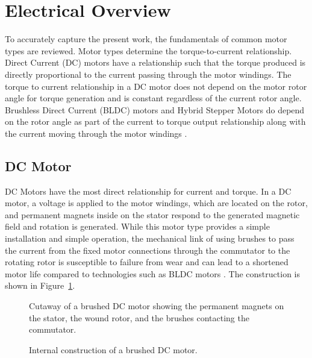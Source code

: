 \section{Electrical Overview}\label{sect:electricalOverview}
To accurately capture the present work, the fundamentals of common motor types are reviewed. Motor types determine the torque-to-current relationship. Direct Current (DC) motors have a relationship such that the torque produced is directly proportional to the current passing through the motor windings. The torque to current relationship in a DC motor does not depend on the motor rotor angle for torque generation and is constant regardless of the current rotor angle. Brushless Direct Current (BLDC) motors and Hybrid Stepper Motors do depend on the rotor angle as part of the current to torque output relationship along with the current moving through the motor windings \cite{binfet_implementation_2026,nilsson_universal_2013}.

\subsection{DC Motor}\label{dcMotors}
DC Motors have the most direct relationship for current and torque. In a DC motor, a voltage is applied to the motor windings, which are located on the rotor, and permanent magnets inside on the stator respond to the generated magnetic field and rotation is generated. While this motor type provides a simple installation and simple operation, the mechanical link of using brushes to pass the current from the fixed motor connections through the commutator to the rotating rotor is susceptible to failure from wear and can lead to a shortened motor life compared to technologies such as BLDC motors \cite{binfet_implementation_2026,nilsson_universal_2013}. The construction is shown in Figure~\ref{fig:dc_motor}.

\begin{figure}[htbp]
	\centering
		{Cutaway of a brushed DC motor showing the permanent magnets on the stator, the wound rotor, and the brushes contacting the commutator.}
	\caption[Brushed DC motor construction]{Internal construction of a brushed DC motor.}
	\label{fig:dc_motor}
\end{figure}

